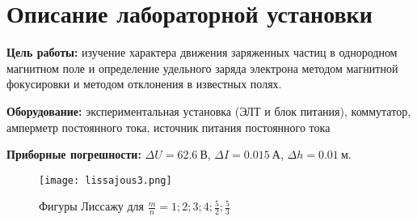 
\newcommand{\labauthor}{Сарафанов Ф.\,Г.}
\newcommand{\labauthors}{Сарафанов Ф.\,Г.}
\newcommand{\labnumber}{17}
\newcommand{\labtheme}{Осциллограф}


\newcommand{\ddt}{$\ \pm\ 0.2\ \text{с}$}
\newcommand{\ddtv}{$\ \pm\ 0.8\ \text{с}$}
\newcommand{\ddh}{$\ \pm\ 0.1\ \text{см}$}
\newcommand{\dm}{\Delta{}m}
\newcommand{\Dh}{\Delta{}x}
\newcommand{\Dl}{\Delta{}(\lambda)}
\newcommand{\dmsr}{<\Delta{}m>}
\newcommand{\el}{\varepsilon(\lambda)}

\usetikzlibrary{%
    decorations.pathreplacing,%
    decorations.pathmorphing,%
    arrows,%
    patterns
}
\newcommand{\Scale}{1}
\newcommand{\lft}{9}
\newcommand{\rft}{10.43*1.5}
\newcommand{\Xstep}{1.5}
\newcommand{\Ystep}{1.5*20}
\newcommand{\Radius}{0.1}
\newcommand{\Color}{black}







\tableofcontents

\newpage
\section{Описание лабораторной установки}

\textbf{Цель работы:} изучение характера движения заряженных частиц в однородном магнитном поле и определение удельного заряда электрона методом магнитной фокусировки и методом отклонения в известных полях.

\textbf{Оборудование:}
экспериментальная установка (ЭЛТ и блок питания), коммутатор, амперметр постоянного тока, источник питания постоянного тока 

\textbf{Приборные погрешности:} $\Delta{U}=62.6\ \text{В}$, $\Delta{I}=0.015\ \text{А}$, $\Delta{h}=0.01\ \text{м}$. 

\begin{figure}[ht!]
	\centering
	\texttt{[image: lissajous3.png]}
	\caption{Фигуры Лиссажу для $\frac{m}{n}=1;2;3;4;\frac{5}{2};\frac{5}{3}$}
	\label{fig:cxem}
\end{figure}

